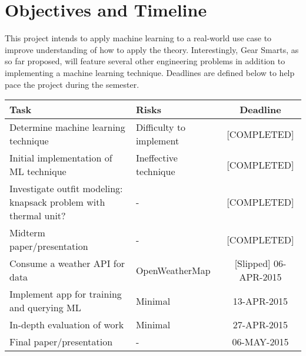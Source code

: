\section{Objectives and Timeline}
\label{section:objectives}
This project intends to apply machine learning to a real-world use case to improve understanding of
how to apply the theory. Interestingly, Gear Smarts, as so far proposed, will
feature several other engineering problems in addition to implementing a machine learning technique.
Deadlines are defined below to help pace the project during the semester.

\begin{center}
 \begin{tabular}{||l l c ||}
 \hline
 \textbf{Task} & \textbf{Risks} & \textbf{Deadline} \\ [0.5ex]
 \hline\hline
 Determine machine learning technique & Difficulty to implement & [COMPLETED] \\
 \hline
 Initial implementation of ML technique & Ineffective technique & [COMPLETED] \\
 \hline
 Investigate outfit modeling: knapsack problem with thermal unit? & - & [COMPLETED] \\
 \hline
 Midterm paper/presentation & - & [COMPLETED] \\
 \hline
 Consume a weather API for data & OpenWeatherMap\cite{API:OpenWeatherMap} & [Slipped] 06-APR-2015 \\
 \hline
 Implement app for training and querying ML & Minimal & 13-APR-2015 \\
 \hline
 In-depth evaluation of work & Minimal & 27-APR-2015 \\
 \hline
 Final paper/presentation & - & 06-MAY-2015 \\
 \hline
\end{tabular}
\end{center}
